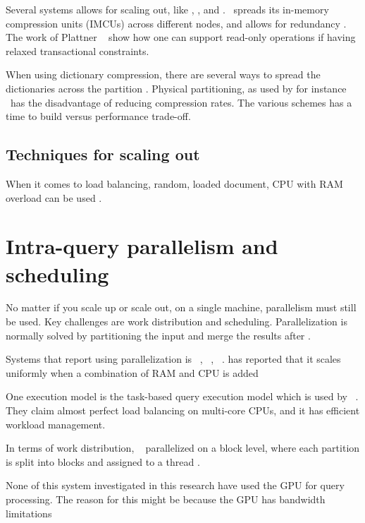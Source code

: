 Several systems allows for scaling out, like \cstore, \sapnw, and \saph. \oracle~spreads its in-memory compression units (IMCUs) across different nodes, and allows for redundancy \cite{Lahiri2015-mz}. The work of Plattner \ea~\cite{Plattner2014-fr} show how one can support read-only operations if having relaxed transactional constraints.

When using dictionary compression, there are several ways to spread the dictionaries across the partition \cite{Psaroudakis2015-lc}. Physical partitioning, as used by for instance \oracle~has the disadvantage of reducing compression rates. The various schemes has a time to build versus performance trade-off.

\subsection{Techniques for scaling out}
\label{sub:Techniques for scaling out}
When it comes to load balancing, random, loaded document, CPU with RAM overload can be used \cite{Qlik2012-ku}.


\section{Intra-query parallelism and scheduling}
\label{sec:Parallelism}
No matter if you scale up or scale out, on a single machine, parallelism must still be used. Key challenges are work distribution and scheduling. Parallelization is normally solved by partitioning the input and merge the results after \cite{Neumann2011-uq}.

Systems that report using parallelization is \vertica~\cite{Lamb2012-kg}, \mssql~\cite{Larson2013-mc}, \blink~\cite{Barber2012-xt, Johnson2008-cp}. \qlikview has reported that it scales uniformly when a combination of RAM and CPU is added \cite{Qlik2011-yc}

One execution model is the task-based query execution model which is used by \hyrise~\cite{Swhalb2014-hn}. They claim almost perfect load balancing on multi-core CPUs, and it has efficient workload management.

In terms of work distribution, \blink~ parallelized on a block level, where each partition is split into blocks and assigned to a thread \cite{Johnson2008-cp, Barber2012-xt}.

None of this system investigated in this research have used the GPU for query processing. The reason for this might be because the GPU has bandwidth limitations \cite{Willhalm2009-hu}

